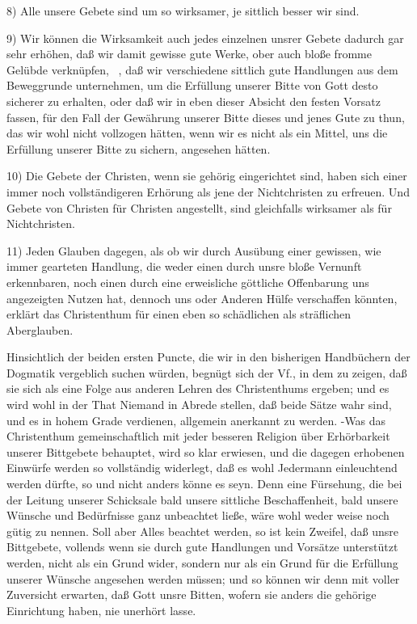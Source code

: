 {8) Alle unsere Gebete sind um so wirksamer, je sittlich besser wir sind. \par
9) Wir können die Wirksamkeit auch jedes einzelnen unsrer Gebete dadurch gar sehr erhöhen, daß wir damit  gewisse gute Werke, ober auch bloße fromme Gelübde verknüpfen, \dh\ , daß wir verschiedene sittlich gute Handlungen aus dem Beweggrunde unternehmen, um die Erfüllung unserer Bitte von Gott desto sicherer zu erhalten, oder daß wir in eben dieser Absicht den festen Vorsatz fassen, für den Fall der Gewährung unserer Bitte dieses und jenes Gute zu thun, das wir wohl nicht vollzogen hätten, wenn wir es nicht als ein Mittel, uns die Erfüllung unserer Bitte zu sichern, angesehen hätten. \par
10) Die Gebete der Christen, wenn sie gehörig eingerichtet sind, haben sich einer immer noch vollständigeren Erhörung als jene der Nichtchristen zu erfreuen. Und Gebete von Christen für Christen angestellt, sind gleichfalls wirksamer als für Nichtchristen. \par
11) Jeden Glauben dagegen, als ob wir durch Ausübung einer gewissen, wie immer gearteten Handlung, die weder einen durch unsre bloße Vernunft erkennbaren, noch einen durch eine erweisliche göttliche Offenbarung uns angezeigten Nutzen hat, dennoch uns oder Anderen Hülfe verschaffen könnten, erklärt das Christenthum für einen eben so schädlichen als sträflichen Aberglauben.} \par
Hinsichtlich der beiden ersten Puncte, die wir in den bisherigen Handbüchern der Dogmatik vergeblich suchen würden, begnügt sich der Vf., in dem  zu zeigen, daß sie sich als eine Folge aus anderen Lehren des Christenthums ergeben; und es wird wohl in der That Niemand in Abrede stellen, daß beide Sätze wahr sind, und es in hohem Grade verdienen, allgemein anerkannt zu werden. -Was das Christenthum gemeinschaftlich mit jeder besseren Religion über Erhörbarkeit unserer Bittgebete behauptet, wird  so klar erwiesen, und die dagegen erhobenen Einwürfe werden so vollständig widerlegt, daß es wohl Jedermann einleuchtend werden dürfte, so und nicht anders könne es seyn. Denn eine Fürsehung, die bei der Leitung unserer Schicksale bald unsere sittliche Beschaffenheit,  bald unsere Wünsche und Bedürfnisse ganz unbeachtet ließe, wäre wohl weder weise noch gütig zu nennen. Soll aber Alles beachtet werden, so ist kein Zweifel, daß unsre Bittgebete, vollends wenn sie durch gute Handlungen und Vorsätze unterstützt werden, nicht als ein Grund wider, sondern nur als ein Grund für die Erfüllung unserer Wünsche angesehen werden müssen; und so können wir denn mit voller Zuversicht erwarten, daß Gott unsre Bitten, wofern sie anders die gehörige Einrichtung haben, nie unerhört lasse. \par
